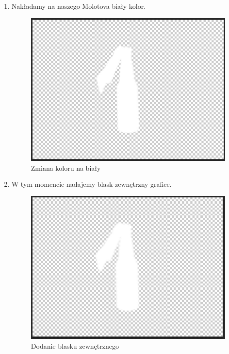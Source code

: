 \begin{enumerate}
  \item Nakładamy na naszego Molotova biały kolor.
\begin{figure}[h]
    \centering
    \includegraphics[scale=0.5]{Images/MolotovPNGWhite.jpg}
    \caption{Zmiana koloru na biały}
\end{figure}
\FloatBarrier

  \item W tym momencie nadajemy blask zewnętrzny grafice.
\begin{figure}[h]
    \centering
    \includegraphics[scale=0.5]{Images/MolotovPNGWhiteBlask.jpg}
    \caption{Dodanie blasku zewnętrznego}
\end{figure}
\FloatBarrier


\end{enumerate}
